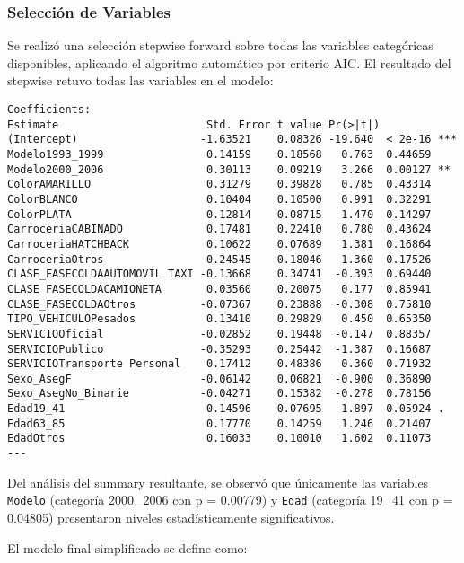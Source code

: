 \subsubsection{Selección de Variables}

Se realizó una selección stepwise forward sobre todas las variables categóricas disponibles, aplicando el algoritmo automático por criterio AIC. El resultado del stepwise retuvo todas las variables en el modelo:

\begin{lstlisting}[style=Routput]
Coefficients:
Estimate                       Std. Error t value Pr(>|t|)    
(Intercept)                   -1.63521    0.08326 -19.640  < 2e-16 ***
Modelo1993_1999                0.14159    0.18568   0.763  0.44659    
Modelo2000_2006                0.30113    0.09219   3.266  0.00127 ** 
ColorAMARILLO                  0.31279    0.39828   0.785  0.43314    
ColorBLANCO                    0.10404    0.10500   0.991  0.32291    
ColorPLATA                     0.12814    0.08715   1.470  0.14297    
CarroceriaCABINADO             0.17481    0.22410   0.780  0.43624    
CarroceriaHATCHBACK            0.10622    0.07689   1.381  0.16864    
CarroceriaOtros                0.24545    0.18046   1.360  0.17526    
CLASE_FASECOLDAAUTOMOVIL TAXI -0.13668    0.34741  -0.393  0.69440    
CLASE_FASECOLDACAMIONETA       0.03560    0.20075   0.177  0.85941    
CLASE_FASECOLDAOtros          -0.07367    0.23888  -0.308  0.75810    
TIPO_VEHICULOPesados           0.13410    0.29829   0.450  0.65350    
SERVICIOOficial               -0.02852    0.19448  -0.147  0.88357    
SERVICIOPublico               -0.35293    0.25442  -1.387  0.16687    
SERVICIOTransporte Personal    0.17412    0.48386   0.360  0.71932    
Sexo_AsegF                    -0.06142    0.06821  -0.900  0.36890    
Sexo_AsegNo_Binarie           -0.04271    0.15382  -0.278  0.78156    
Edad19_41                      0.14596    0.07695   1.897  0.05924 .  
Edad63_85                      0.17770    0.14259   1.246  0.21407    
EdadOtros                      0.16033    0.10010   1.602  0.11073    
---
\end{lstlisting}

Del análisis del summary resultante, se observó que únicamente las variables \texttt{Modelo} (categoría 2000\_2006 con p = 0.00779) y \texttt{Edad} (categoría 19\_41 con p = 0.04805) presentaron niveles estadísticamente significativos.

El modelo final simplificado se define como:

